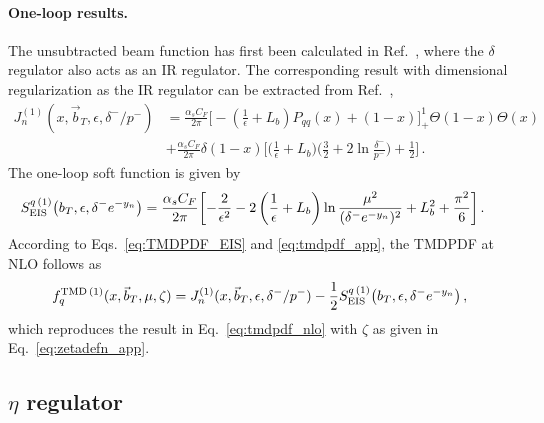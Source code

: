 \documentclass[11pt,a4paper]{article}
\DeclareRobustCommand{\eq}[1]{Eq.~\eqref{eq:#1}}
\DeclareRobustCommand{\eqs}[2]{Eqs.~\eqref{eq:#1} and \eqref{eq:#2}}
\DeclareRobustCommand{\mycite}[1]{Ref.~\cite{#1}}
\newcommand{\eps}{\epsilon}
\newcommand{\nn}{\nonumber}
\newcommand{\as}{\alpha_s}
\newcommand\TMD{\mathrm{TMD}}
\newcommand{\bt}{\vec b_T}
\begin{document}
\paragraph{One-loop results.}
The unsubtracted beam function has first been calculated in \mycite{GarciaEchevarria:2011rb},
where the $\delta$ regulator also acts as an IR regulator.
The corresponding result with dimensional regularization as the IR regulator can be extracted from \mycite{Echevarria:2016scs},
\begin{align} \label{eq:beam_naive_nlo_delta}
 J_n^{(1)}(x,\bt,\eps,\delta^-/p^-) &
 = \frac{\as C_F}{2\pi} \biggl[ -\left(\frac{1}{\eps} + L_b\right) P_{qq}(x) + (1-x)\biggr]_+^1\Theta(1-x)\Theta(x)
 \nn\\&
 + \frac{\as C_F}{2\pi} \delta(1-x) \biggl[
   \biggl(\frac{1}{\eps} + L_b\biggr)\biggl(\frac{3}{2} + 2 \ln\frac{\delta^-}{p^-}\biggr) + \frac{1}{2} \biggr]
\,.\end{align}
The one-loop soft function is given by \cite{Echevarria:2012js}
\begin{align} \label{eq:soft_nlo_delta}
 S_{\rm EIS}^{q\,(1)}\bigl(b_T,\eps, \delta^- e^{-y_n}\bigr) &= \frac{\as C_F}{2\pi} \biggl[
  - \frac{2}{\eps^2} - 2 \left(\frac{1}{\eps} + L_b\right) \ln\frac{\mu^2}{(\delta^- e^{-y_n})^2}
  + L_b^2 + \frac{\pi^2}{6}  \biggr]
\,.\end{align}
According to \eqs{TMDPDF_EIS}{tmdpdf_app}, the TMDPDF at NLO follows as
\begin{align}
 f^{\TMD\,(1)}_q(x,\bt,\mu,\zeta) = J_n^{(1)}(x,\bt,\eps,\delta^-/p^-) - \frac{1}{2} S_{\rm EIS}^{q\,(1)}\bigl(b_T,\eps, \delta^- e^{-y_n}\bigr)
\,,\end{align}
which reproduces the result in \eq{tmdpdf_nlo} with $\zeta$ as given in \eq{zetadefn_app}.


\subsection[\texorpdfstring{$\eta$ regulator}{eta regulator}]
           {\texorpdfstring{\boldmath $\eta$}{Eta} regulator}
\label{app:eta_regulator}
\end{document}
